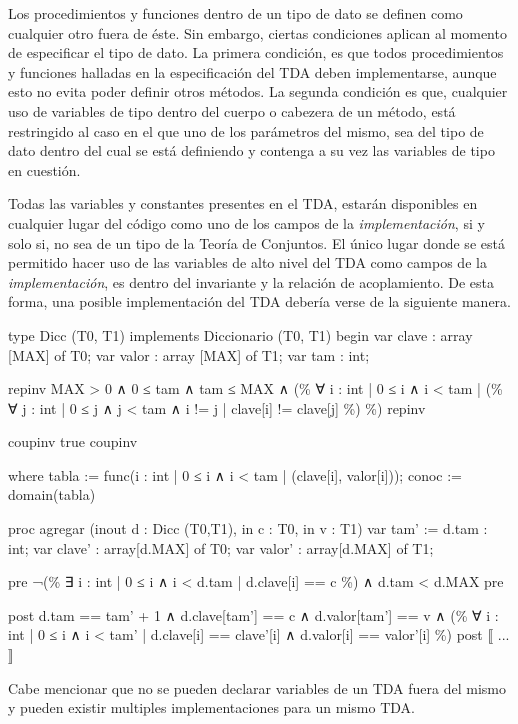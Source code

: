 Los procedimientos y funciones dentro de un tipo de dato se definen como
cualquier otro fuera de éste. Sin embargo, ciertas condiciones aplican al
momento de especificar el tipo de dato. La primera condición, es que todos
procedimientos y funciones halladas en la especificación del TDA deben
implementarse, aunque esto no evita poder definir otros métodos. La segunda
condición es que, cualquier uso de variables de tipo dentro del cuerpo o
cabezera de un método, está restringido al caso en el que uno de los
parámetros del mismo, sea del tipo de dato dentro del cual se está definiendo
y contenga a su vez las variables de tipo en cuestión.

Todas las variables y constantes presentes en el TDA, estarán disponibles en
cualquier lugar del código como uno de los campos de la
\textit{implementación}, si y solo si, no sea de un tipo de la Teoría de
Conjuntos. El único lugar donde se está permitido hacer uso de las variables
de alto nivel del TDA como campos de la \textit{implementación}, es dentro del
invariante y la relación de acoplamiento. De esta forma, una posible
implementación del TDA  debería verse de la siguiente
manera.

\begin{gracielacode}
type Dicc (T0, T1) implements Diccionario (T0, T1) begin
  var clave : array [MAX] of T0;
  var valor : array [MAX] of T1;
  var tam   : int;

  {repinv MAX > 0 ∧ 0 ≤ tam ∧ tam ≤ MAX ∧
    (\% ∀ i : int | 0 ≤ i ∧ i < tam
      | (\% ∀ j : int | 0 ≤ j ∧ j < tam ∧ i != j | clave[i] != clave[j] \%)
    \%)
  repinv}

  {coupinv true coupinv}

  where {
  	tabla := func({i : int | 0 ≤ i ∧ i < tam | (clave[i], valor[i])});
    conoc := domain(tabla)
  }

  proc agregar (inout d : Dicc (T0,T1), in c : T0, in v : T1)
    var tam' := d.tam : int;
    var clave'        : array[d.MAX] of T0;
    var valor'        : array[d.MAX] of T1;

    {pre ¬(\% ∃ i : int | 0 ≤ i ∧ i < d.tam | d.clave[i] == c \%) ∧ d.tam < d.MAX pre}

    {post d.tam == tam' + 1 ∧ d.clave[tam'] == c ∧  d.valor[tam'] == v
              ∧ (\% ∀ i : int | 0 ≤ i ∧ i < tam' | d.clave[i] == clave'[i]
                                                ∧ d.valor[i] == valor'[i] \%) post}
    ⟦
     ...
    ⟧
\end{gracielacode}

Cabe mencionar que no se pueden declarar variables de un TDA fuera del mismo y
pueden existir multiples implementaciones para un mismo TDA.
